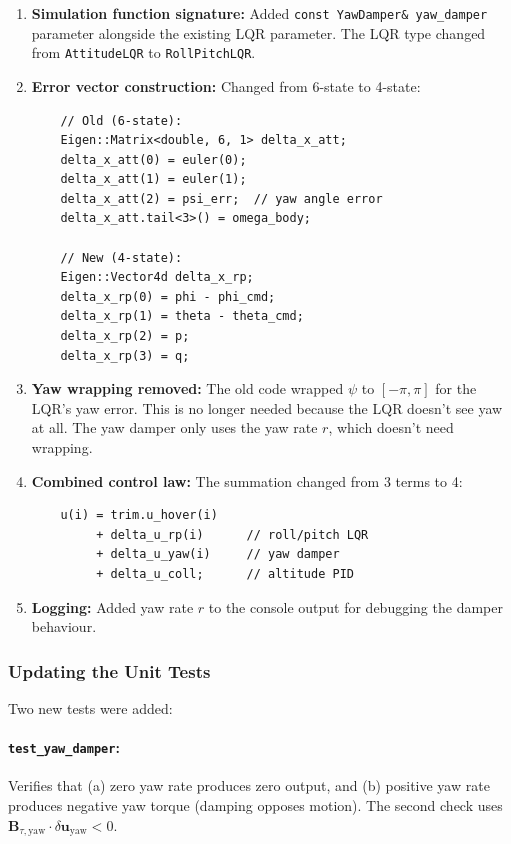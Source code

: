 \documentclass[12pt, a4paper]{article}
\newcommand{\bu}{\bm{u}}
\newcommand{\bB}{\bm{B}}
\begin{document}
\begin{enumerate}
    \item \textbf{Simulation function signature:} Added \texttt{const YawDamper\& yaw\_damper} parameter alongside the existing LQR parameter.  The LQR type changed from \texttt{AttitudeLQR} to \texttt{RollPitchLQR}.

    \item \textbf{Error vector construction:} Changed from 6-state to 4-state:
\begin{verbatim}
    // Old (6-state):
    Eigen::Matrix<double, 6, 1> delta_x_att;
    delta_x_att(0) = euler(0);
    delta_x_att(1) = euler(1);
    delta_x_att(2) = psi_err;  // yaw angle error
    delta_x_att.tail<3>() = omega_body;

    // New (4-state):
    Eigen::Vector4d delta_x_rp;
    delta_x_rp(0) = phi - phi_cmd;
    delta_x_rp(1) = theta - theta_cmd;
    delta_x_rp(2) = p;
    delta_x_rp(3) = q;
\end{verbatim}

    \item \textbf{Yaw wrapping removed:}  The old code wrapped $\psi$ to $[-\pi, \pi]$ for the LQR's yaw error.  This is no longer needed because the LQR doesn't see yaw at all.  The yaw damper only uses the yaw rate $r$, which doesn't need wrapping.

    \item \textbf{Combined control law:}  The summation changed from 3 terms to 4:
\begin{verbatim}
    u(i) = trim.u_hover(i)
         + delta_u_rp(i)      // roll/pitch LQR
         + delta_u_yaw(i)     // yaw damper
         + delta_u_coll;      // altitude PID
\end{verbatim}

    \item \textbf{Logging:}  Added yaw rate $r$ to the console output for debugging the damper behaviour.
\end{enumerate}

\subsubsection{Updating the Unit Tests}

Two new tests were added:

\paragraph{\texttt{test\_yaw\_damper}:}  Verifies that (a) zero yaw rate produces zero output, and (b) positive yaw rate produces negative yaw torque (damping opposes motion).  The second check uses $\bB_{\tau,\text{yaw}} \cdot \delta\bu_{\text{yaw}} < 0$.
\end{document}
